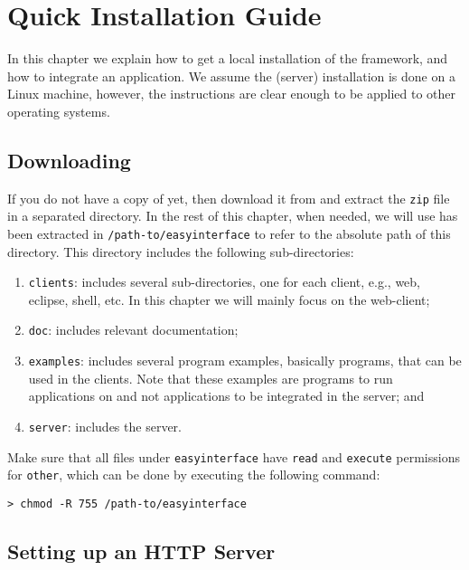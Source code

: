 {%
}

\chapter{Quick Installation Guide}

In this chapter we explain how to get a local installation of the \ei
framework, and how to integrate an application. We assume the (server)
installation is done on a Linux machine, however, the instructions are
clear enough to be applied to other operating systems.

\section{Downloading \ei}

If you do not have a copy of \ei yet, then download it from
\eidownloadurl and extract the \texttt{zip} file in a separated
directory. In the rest of this chapter, when needed, we will use has
been extracted in \texttt{/path-to/easyinterface} to refer to the
absolute path of this directory. This directory includes the following
sub-directories:
%
\begin{enumerate} 
%
%
\item \texttt{clients}: includes several sub-directories, one for each
  client, e.g., web, eclipse, shell, etc. In this chapter we will
  mainly focus on the web-client;
%
\item \texttt{doc}: includes relevant documentation;
%
%
\item \texttt{examples}: includes several program examples, basically
  \abs programs, that can be used in the \ei clients. Note that these
  examples are programs to run applications on and not applications to
  be integrated in the server; and
%
\item \texttt{server}: includes the \ei server.
%
\end{enumerate}
%
Make sure that all files under \texttt{easyinterface} have
\texttt{read} and \texttt{execute} permissions for \texttt{other},
which can be done by executing the following command:

\medskip
\begin{lstlisting}[style=shell]
> chmod -R 755 /path-to/easyinterface
\end{lstlisting}

\section{Setting up an HTTP Server}

